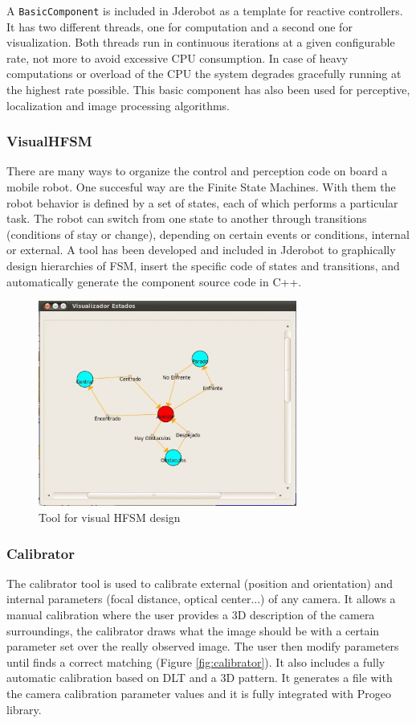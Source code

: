 \documentclass[twocolumn]{svjour3}          %
\begin{document}
A \texttt{BasicComponent} is included in Jderobot as a template for reactive controllers. It has two different threads, one for computation and a second one for visualization. Both threads run in continuous iterations at a given configurable rate, not more to avoid excessive CPU consumption. In case of heavy computations or overload of the CPU the system degrades gracefully running at the highest rate possible. This basic component has also been used for perceptive, localization and image processing algorithms.

\subsubsection{VisualHFSM}

There are many ways to organize the control and perception code on board a mobile robot. One succesful way are the Finite State Machines. With them the robot behavior is defined by a set of states, each of which performs a particular task. The robot can switch from one state to another through transitions (conditions of stay or change), depending on certain events or conditions, internal or external. A tool has been developed and included in Jderobot to graphically design hierarchies of FSM, insert the specific code of states and transitions, and automatically generate the component source code in C++.

\begin{figure}[h!]
  \includegraphics[width=8.5cm]{figs/ratonGatoAutoEjec.jpg}
\caption{Tool for visual HFSM design}
\label{fig:visualHFSM}
\end{figure}

\subsubsection{Calibrator}

The calibrator tool is used to calibrate external (position and orientation) and internal parameters (focal distance, optical center...) of any camera. It allows a manual calibration where the user provides a 3D description of the camera surroundings, the calibrator draws what the image should be with a certain parameter set over the really observed image. The user then modify parameters until finds a correct matching (Figure \ref{fig:calibrator}). It also includes a fully automatic calibration based on DLT and a 3D pattern. It generates a file with the camera calibration parameter values and it is fully integrated with Progeo library.
\end{document}
